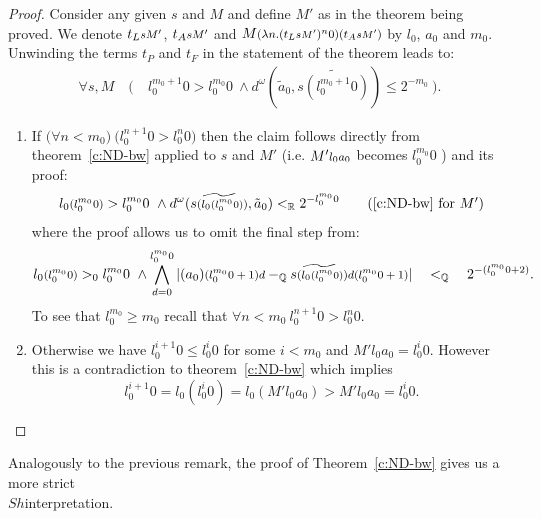 \begin{proof} 
Consider any given $s$ and $M$ and define
$M'$ as in the theorem being proved. We denote $t_L\args{sM'}$, 
$t_A\args{sM'}$ and $M\args{(\lambda n.(t_L\args{sM'})^n0)
(t_A\args{sM'})}$ by $l_0$, $a_0$ and $m_0$. 
Unwinding the terms $t_P$ and $t_F$ in the statement of the theorem leads to:
\begin{align*}
\forall s,M \quad (\ &l_0^{m_0+1}0 > l_0^{m_0}0 \ \wedge d^\omega 
( \tilde{a}_0, \widetilde{s(l_0^{m_0+1} 0 )})\leq 2^{-m_0}\ ).
\end{align*}
\begin{enumerate}
\item If $\big(\forall n<m_0\big)\ \big(l_0^{n+1}0>l_0^n0\big)$ then the 
claim follows directly
from theorem~\ref{c:ND-bw} applied to $s$ and $M'$ (i.e.
$ M'\args{l_0a_0} $ becomes $l_0^{m_0}0$ ) 
and its proof:
\begin{align*}
l_0\args{(l_0^{m_0}0)} > l_0^{m_0}0\ \wedge 
d^\omega( \widetilde { s\args{(l_0\args{(l_0^{m_0}0)})} },\tilde{a}_0)
<_\RR2^{-l_0^{m_0}0}
  \tag{\ref{c:ND-bw} for $M'$}\label{ND-bw4Kprime}
\end{align*}
where the proof allows us to omit the final step from:
\begin{align*}
  l_0\args{(l_0^{m_0}0)}>_0 
  l_0^{m_0}0\ \wedge  \bigwedge_{d=0}^{l_0^{m_0}0}
        |(a_0)\args{(l_0^{m_0}0+1)d}-_\QQ 
\widetilde{s\args{(l_0\args{(l_0^{m_0}0)})}}\args{d(l_0^{m_0}0+1)}|
         \quad<_\QQ\quad 2^{-(l_0^{m_0}0+2)}
\text{.}
\end{align*}
To see that $l_0^{m_0}\geq m_0$ recall that $\forall n<m_0\ l_0^{n+1}0>l_0^n0$.
\item Otherwise we have $l_0^{i+1}0\leq l_0^i0$ for some $i<m_0$ and 
$M'l_0a_0=l_0^i0$. However
this is a contradiction to
 theorem~\ref{c:ND-bw} which implies
\[
l_0^{i+1}0 = l_0(l_0^i0) = l_0 ( M'l_0a_0) > M'l_0a_0 = l_0^i0.
\]
\end{enumerate}
\end{proof}
\begin{remark}
Analogously to the previous remark, the proof of Theorem~\ref{c:ND-bw} 
gives us a more strict\\ $Sh$\nbd interpretation.
\end{remark}

